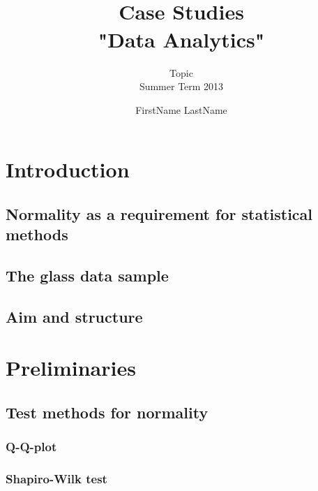 \documentclass[a4paper, 12pt, titlepage, headsepline, listof = totoc, bibliography = totoc, numbers = noenddot]{scrartcl}
\title{\hrulefill \\ \vspace*{1cm} Case Studies\\\vspace*{0.5cm}
 "Data Analytics" \\ \vspace*{1cm}\hrulefill\vspace*{1.5cm}}
\subtitle{Topic\\\vspace*{1.5cm} Summer Term 2013\vspace*{1.5cm}}
\author{FirstName LastName}
\begin{document}

\thispagestyle{empty}
\maketitle


\thispagestyle{empty}
\tableofcontents


\newpage
\setcounter{page}{1}
\section{Introduction}

\subsection{Normality as a requirement for statistical methods}

\subsection{The glass data sample}

\subsection{Aim and structure}

\newpage
\section{Preliminaries}

\subsection{Test methods for normality}

\subsubsection{Q-Q-plot}

\subsubsection{Shapiro-Wilk test}
\end{document}
